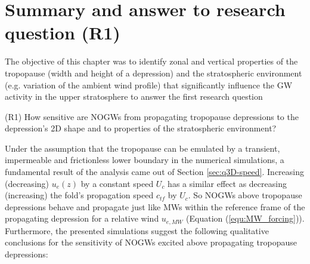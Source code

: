 \section{Summary and answer to research question (R1)}
\label{sec:q3D-summary}
The objective of this chapter was to identify zonal and vertical properties of the tropopause (width and height of a depression) and the stratospheric environment (e.g. variation of the ambient wind profile) that significantly influence the GW activity in the upper stratosphere to answer the first research question
\begin{tcolorbox}[]
    (R1) How sensitive are NOGWs from propagating tropopause depressions to the depression's 2D shape and to properties of the stratospheric environment?
\end{tcolorbox}
Under the assumption that the tropopause can be emulated by a transient, impermeable and frictionless lower boundary in the numerical simulations, a fundamental result of the analysis came out of Section \ref{sec:q3D-speed}. Increasing (decreasing) $u_e(z)$ by a constant speed $U_c$ has a similar effect as decreasing (increasing) the fold's propagation speed $c_{tf}$ by $U_c$. So NOGWs above tropopause depressions behave and propagate just like MWs within the reference frame of the propagating depression for a relative wind $u_{e,MW}$ (Equation (\ref{equ:MW_forcing})). \\
Furthermore, the presented simulations suggest the following qualitative conclusions for the sensitivity of NOGWs excited above propagating tropopause depressions:
